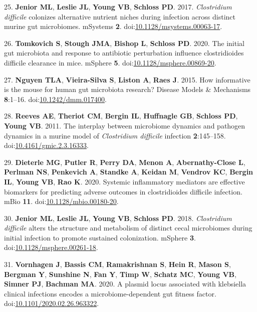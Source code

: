 \documentclass[
  11pt,
]{article}
\begin{document}
\leavevmode\hypertarget{ref-Jenior2017}{}%
25. \textbf{Jenior ML}, \textbf{Leslie JL}, \textbf{Young VB},
\textbf{Schloss PD}. 2017. \emph{Clostridium difficile} colonizes
alternative nutrient niches during infection across distinct murine gut
microbiomes. mSystems \textbf{2}.
doi:\href{https://doi.org/10.1128/msystems.00063-17}{10.1128/msystems.00063-17}.

\leavevmode\hypertarget{ref-Tomkovich2020}{}%
26. \textbf{Tomkovich S}, \textbf{Stough JMA}, \textbf{Bishop L},
\textbf{Schloss PD}. 2020. The initial gut microbiota and response to
antibiotic perturbation influence clostridioides difficile clearance in
mice. mSphere \textbf{5}.
doi:\href{https://doi.org/10.1128/msphere.00869-20}{10.1128/msphere.00869-20}.

\leavevmode\hypertarget{ref-Nguyen2015}{}%
27. \textbf{Nguyen TLA}, \textbf{Vieira-Silva S}, \textbf{Liston A},
\textbf{Raes J}. 2015. How informative is the mouse for human gut
microbiota research? Disease Models \& Mechanisms \textbf{8}:1--16.
doi:\href{https://doi.org/10.1242/dmm.017400}{10.1242/dmm.017400}.

\leavevmode\hypertarget{ref-Reeves2011}{}%
28. \textbf{Reeves AE}, \textbf{Theriot CM}, \textbf{Bergin IL},
\textbf{Huffnagle GB}, \textbf{Schloss PD}, \textbf{Young VB}. 2011. The
interplay between microbiome dynamics and pathogen dynamics in a murine
model of \emph{Clostridium difficile} infection \textbf{2}:145--158.
doi:\href{https://doi.org/10.4161/gmic.2.3.16333}{10.4161/gmic.2.3.16333}.

\leavevmode\hypertarget{ref-Dieterle2020}{}%
29. \textbf{Dieterle MG}, \textbf{Putler R}, \textbf{Perry DA},
\textbf{Menon A}, \textbf{Abernathy-Close L}, \textbf{Perlman NS},
\textbf{Penkevich A}, \textbf{Standke A}, \textbf{Keidan M},
\textbf{Vendrov KC}, \textbf{Bergin IL}, \textbf{Young VB}, \textbf{Rao
K}. 2020. Systemic inflammatory mediators are effective biomarkers for
predicting adverse outcomes in clostridioides difficile infection. mBio
\textbf{11}.
doi:\href{https://doi.org/10.1128/mbio.00180-20}{10.1128/mbio.00180-20}.

\leavevmode\hypertarget{ref-Jenior2018}{}%
30. \textbf{Jenior ML}, \textbf{Leslie JL}, \textbf{Young VB},
\textbf{Schloss PD}. 2018. \emph{Clostridium difficile} alters the
structure and metabolism of distinct cecal microbiomes during initial
infection to promote sustained colonization. mSphere \textbf{3}.
doi:\href{https://doi.org/10.1128/msphere.00261-18}{10.1128/msphere.00261-18}.

\leavevmode\hypertarget{ref-Vornhagen2020}{}%
31. \textbf{Vornhagen J}, \textbf{Bassis CM}, \textbf{Ramakrishnan S},
\textbf{Hein R}, \textbf{Mason S}, \textbf{Bergman Y}, \textbf{Sunshine
N}, \textbf{Fan Y}, \textbf{Timp W}, \textbf{Schatz MC}, \textbf{Young
VB}, \textbf{Simner PJ}, \textbf{Bachman MA}. 2020. A plasmid locus
associated with klebsiella clinical infections encodes a
microbiome-dependent gut fitness factor.
doi:\href{https://doi.org/10.1101/2020.02.26.963322}{10.1101/2020.02.26.963322}.
\end{document}
